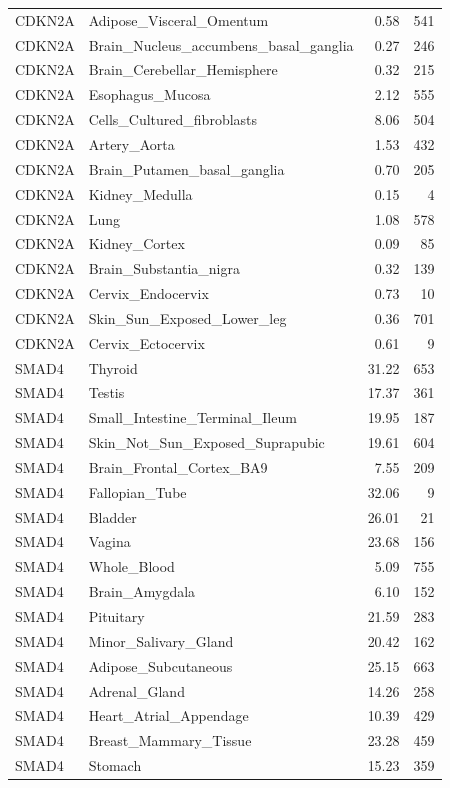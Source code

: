 \begin{footnotesize}
\begin{longtable}{llrr}
CDKN2A & Adipose\_Visceral\_Omentum & 0.58 & 541 \\
CDKN2A & Brain\_Nucleus\_accumbens\_basal\_ganglia & 0.27 & 246 \\
CDKN2A & Brain\_Cerebellar\_Hemisphere & 0.32 & 215 \\
CDKN2A & Esophagus\_Mucosa & 2.12 & 555 \\
CDKN2A & Cells\_Cultured\_fibroblasts & 8.06 & 504 \\
CDKN2A & Artery\_Aorta & 1.53 & 432 \\
CDKN2A & Brain\_Putamen\_basal\_ganglia & 0.70 & 205 \\
CDKN2A & Kidney\_Medulla & 0.15 & 4 \\
CDKN2A & Lung & 1.08 & 578 \\
CDKN2A & Kidney\_Cortex & 0.09 & 85 \\
CDKN2A & Brain\_Substantia\_nigra & 0.32 & 139 \\
CDKN2A & Cervix\_Endocervix & 0.73 & 10 \\
CDKN2A & Skin\_Sun\_Exposed\_Lower\_leg & 0.36 & 701 \\
CDKN2A & Cervix\_Ectocervix & 0.61 & 9 \\
SMAD4 & Thyroid & 31.22 & 653 \\
SMAD4 & Testis & 17.37 & 361 \\
SMAD4 & Small\_Intestine\_Terminal\_Ileum & 19.95 & 187 \\
SMAD4 & Skin\_Not\_Sun\_Exposed\_Suprapubic & 19.61 & 604 \\
SMAD4 & Brain\_Frontal\_Cortex\_BA9 & 7.55 & 209 \\
SMAD4 & Fallopian\_Tube & 32.06 & 9 \\
SMAD4 & Bladder & 26.01 & 21 \\
SMAD4 & Vagina & 23.68 & 156 \\
SMAD4 & Whole\_Blood & 5.09 & 755 \\
SMAD4 & Brain\_Amygdala & 6.10 & 152 \\
SMAD4 & Pituitary & 21.59 & 283 \\
SMAD4 & Minor\_Salivary\_Gland & 20.42 & 162 \\
SMAD4 & Adipose\_Subcutaneous & 25.15 & 663 \\
SMAD4 & Adrenal\_Gland & 14.26 & 258 \\
SMAD4 & Heart\_Atrial\_Appendage & 10.39 & 429 \\
SMAD4 & Breast\_Mammary\_Tissue & 23.28 & 459 \\
SMAD4 & Stomach & 15.23 & 359 \\

\end{longtable}
\end{footnotesize}
